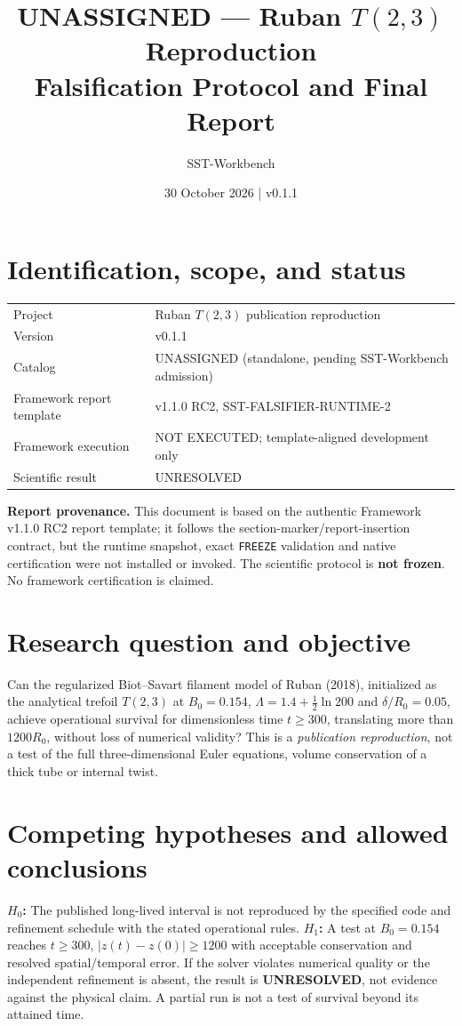 \documentclass[11pt,a4paper]{article}
\title{UNASSIGNED --- Ruban $T(2,3)$ Reproduction\\Falsification Protocol and Final Report}
\author{SST-Workbench}
\date{30 October 2026 | v0.1.1}
\begin{document}
\maketitle


\section{Identification, scope, and status}
\begin{center}\begin{tabular}{ll}\toprule
Project & Ruban $T(2,3)$ publication reproduction\\
Version & v0.1.1\\
Catalog & UNASSIGNED (standalone, pending SST-Workbench admission)\\
Framework report template & v1.1.0 RC2, SST-FALSIFIER-RUNTIME-2\\
Framework execution & NOT EXECUTED; template-aligned development only\\
Scientific result & UNRESOLVED\\\bottomrule\end{tabular}\end{center}
\noindent\textbf{Report provenance.} This document is based on the authentic Framework v1.1.0 RC2 report template; it follows the section-marker/report-insertion contract, but the runtime snapshot, exact \texttt{FREEZE} validation and native certification were not installed or invoked. The scientific protocol is \textbf{not frozen}. No framework certification is claimed.


\section{Research question and objective}
Can the regularized Biot--Savart filament model of Ruban (2018), initialized as the analytical trefoil $T(2,3)$ at $B_0=0.154$, $\Lambda=1.4+\tfrac12\ln 200$ and $\delta/R_0=0.05$, achieve operational survival for dimensionless time $t\ge300$, translating more than $1200R_0$, without loss of numerical validity? This is a \emph{publication reproduction}, not a test of the full three-dimensional Euler equations, volume conservation of a thick tube or internal twist.


\section{Competing hypotheses and allowed conclusions}
\textbf{$H_0$:} The published long-lived interval is not reproduced by the specified code and refinement schedule with the stated operational rules. \textbf{$H_1$:} A test at $B_0=0.154$ reaches $t\ge300$, $|z(t)-z(0)|\ge1200$ with acceptable conservation and resolved spatial/temporal error. If the solver violates numerical quality or the independent refinement is absent, the result is \textbf{UNRESOLVED}, not evidence against the physical claim. A partial run is not a test of survival beyond its attained time.
\end{document}
